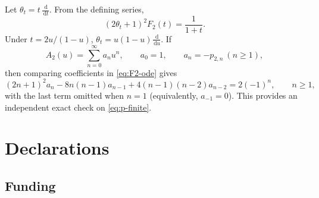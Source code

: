 \documentclass[11pt,reqno]{amsart}
\numberwithin{equation}{section}
\theoremstyle{definition}
\theoremstyle{remark}
\newcommand{\dd}{\,\mathrm{d}}
\begin{document}
Let \(\theta_t=t\,\frac{\dd}{\dd t}\).  From the defining series,
\begin{equation}\label{eq:F2-ode}
 (2\theta_t+1)^2F_2(t)=\frac1{1+t}.
\end{equation}
Under \(t=2u/(1-u)\),
\(
 \theta_t=u(1-u)\frac{\dd}{\dd u}.
\)
If
\[
 A_2(u)=\sum_{n=0}^{\infty}a_nu^n,
 \qquad a_0=1,\qquad a_n=-p_{2,n}\ (n\geq1),
\]
then comparing coefficients in \eqref{eq:F2-ode} gives
\begin{equation}\label{eq:a-ode-recurrence}
 (2n+1)^2a_n
 -8n(n-1)a_{n-1}
 +4(n-1)(n-2)a_{n-2}
 =2(-1)^n,
 \qquad n\geq1,
\end{equation}
with the last term omitted when \(n=1\) (equivalently,
\(a_{-1}=0\)).
This provides an independent exact check on
\eqref{eq:p-finite}.

\section*{Declarations}

\subsection*{Funding}
\end{document}
